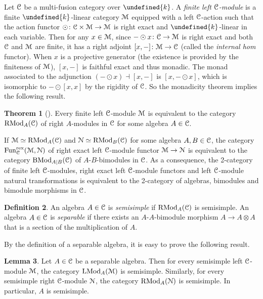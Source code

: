 \documentclass[10pt]{article}
\let\mathbb\undefined
\theoremstyle{definition}
\newtheorem{thm}{Theorem}[section]
\newtheorem{lem}[thm]{Lemma}
\newtheorem{defn}[thm]{Definition}
\numberwithin{equation}{section}
\numberwithin{thm}{section}
\newcommand{\bk}{\mathbb{k}}
\newcommand{\CC}{\EuScript{C}}
\newcommand{\CM}{\EuScript{M}}
\newcommand{\CN}{\EuScript{N}}
\DeclareMathOperator{\fun}{Fun}
\DeclareMathOperator{\LMod}{LMod}
\DeclareMathOperator{\RMod}{RMod}
\DeclareMathOperator{\BMod}{BMod}
\newcommand{\rex}{\mathrm{rex}}
\begin{document}
Let $\CC$ be a multi-fusion category over $\bk$. A \emph{finite left $\CC$-module} is a finite $\bk$-linear category $\CM$ equipped with a left $\CC$-action such that the action functor $\odot \colon \CC \times \CM \to \CM$ is right exact and $\bk$-linear in each variable. Then for any $x \in \CM$, since $- \odot x \colon \CC \to \CM$ is right exact and both $\CC$ and $\CM$ are finite, it has a right adjoint $[x,-] \colon \CM \to \CC$ (called the \emph{internal hom} functor). When $x$ is a projective generator (the existence is provided by the finiteness of $\CM$), $[x,-]$ is faithful exact and thus monadic. The monad associated to the adjunction $(- \odot x) \dashv [x,-]$ is $[x,- \odot x]$, which is isomorphic to $- \odot [x,x]$ by the rigidity of $\CC$. So the monadicity theorem implies the following result.

\begin{thm}[\textnormal{\cite[Theorem 1]{Ost03}}] \label{thm_Ostrik_module_algebra}
Every finite left $\CC$-module $\CM$ is equivalent to the category $\RMod_A(\CC)$ of right $A$-modules in $\CC$ for some algebra $A \in \CC$.
\end{thm}

If $\CM \simeq \RMod_A(\CC)$ and $\CN \simeq \RMod_B(\CC)$ for some algebra $A,B \in \CC$, the category $\fun_\CC^\rex(\CM,\CN)$ of right exact left $\CC$-module functor $\CM \to \CN$ is equivalent to the category $\BMod_{A|B}(\CC)$ of $A$-$B$-bimodules in $\CC$. As a consequence, the 2-category of finite left $\CC$-modules, right exact left $\CC$-module functors and left $\CC$-module natural transformations is equivalent to the 2-category of algebras, bimodules and bimodule morphisms in $\CC$.

\begin{defn}
An algebra $A \in \CC$ is \emph{semisimple} if $\RMod_A(\CC)$ is semisimple. An algebra $A \in \CC$ is \emph{separable} if there exists an $A$-$A$-bimodule morphism $A \to A \otimes A$ that is a section of the multiplication of $A$.
\end{defn}

By the definition of a separable algebra, it is easy to prove the following result.

\begin{lem}
Let $A \in \CC$ be a separable algebra. Then for every semisimple left $\CC$-module $\CM$, the category $\LMod_A(\CM)$ is semisimple. Similarly, for every semisimple right $\CC$-module $\CN$, the category $\RMod_A(\CN)$ is semisimple. In particular, $A$ is semisimple.
\end{lem}
\end{document}
